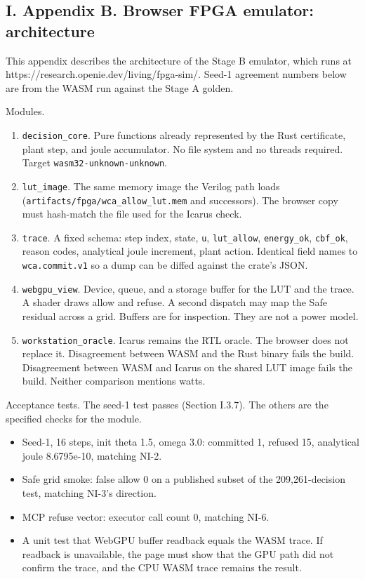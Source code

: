 \documentclass[
  10pt,
]{article}
\providecommand{\tightlist}{%
  \setlength{\itemsep}{0pt}\setlength{\parskip}{0pt}}
\begin{document}
\subsection{I. Appendix B. Browser FPGA emulator:
architecture}\label{i.-appendix-b.-browser-fpga-emulator-architecture}

This appendix describes the architecture of the Stage B emulator, which
runs at https://research.openie.dev/living/fpga-sim/. Seed-1 agreement
numbers below are from the WASM run against the Stage A golden.

Modules.

\begin{enumerate}
\def\labelenumi{\arabic{enumi}.}
\tightlist
\item
  \texttt{decision\_core}. Pure functions already represented by the
  Rust certificate, plant step, and joule accumulator. No file system
  and no threads required. Target \texttt{wasm32-unknown-unknown}.
\item
  \texttt{lut\_image}. The same memory image the Verilog path loads
  (\texttt{artifacts/fpga/wca\_allow\_lut.mem} and successors). The
  browser copy must hash-match the file used for the Icarus check.
\item
  \texttt{trace}. A fixed schema: step index, state, \texttt{u},
  \texttt{lut\_allow}, \texttt{energy\_ok}, \texttt{cbf\_ok}, reason
  codes, analytical joule increment, plant action. Identical field names
  to \texttt{wca.commit.v1} so a dump can be diffed against the crate's
  JSON.
\item
  \texttt{webgpu\_view}. Device, queue, and a storage buffer for the LUT
  and the trace. A shader draws allow and refuse. A second dispatch may
  map the Safe residual across a grid. Buffers are for inspection. They
  are not a power model.
\item
  \texttt{workstation\_oracle}. Icarus remains the RTL oracle. The
  browser does not replace it. Disagreement between WASM and the Rust
  binary fails the build. Disagreement between WASM and Icarus on the
  shared LUT image fails the build. Neither comparison mentions watts.
\end{enumerate}

Acceptance tests. The seed-1 test passes (Section I.3.7). The others are
the specified checks for the module.

\begin{itemize}
\tightlist
\item
  Seed-1, 16 steps, init theta 1.5, omega 3.0: committed 1, refused 15,
  analytical joule 8.6795e-10, matching NI-2.
\item
  Safe grid smoke: false allow 0 on a published subset of the
  209,261-decision test, matching NI-3's direction.
\item
  MCP refuse vector: executor call count 0, matching NI-6.
\item
  A unit test that WebGPU buffer readback equals the WASM trace. If
  readback is unavailable, the page must show that the GPU path did not
  confirm the trace, and the CPU WASM trace remains the result.
\end{itemize}
\end{document}
